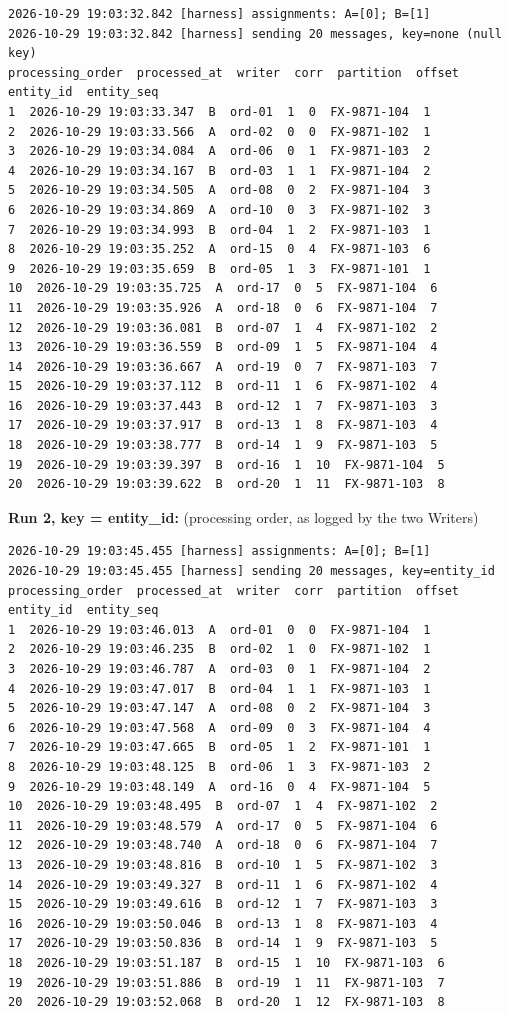 \documentclass[11pt]{article}
\begin{document}
\begingroup\lstset{basicstyle=\ttfamily\tiny}
\begin{lstlisting}
2026-10-29 19:03:32.842 [harness] assignments: A=[0]; B=[1]
2026-10-29 19:03:32.842 [harness] sending 20 messages, key=none (null key)
processing_order  processed_at  writer  corr  partition  offset  entity_id  entity_seq
1  2026-10-29 19:03:33.347  B  ord-01  1  0  FX-9871-104  1
2  2026-10-29 19:03:33.566  A  ord-02  0  0  FX-9871-102  1
3  2026-10-29 19:03:34.084  A  ord-06  0  1  FX-9871-103  2
4  2026-10-29 19:03:34.167  B  ord-03  1  1  FX-9871-104  2
5  2026-10-29 19:03:34.505  A  ord-08  0  2  FX-9871-104  3
6  2026-10-29 19:03:34.869  A  ord-10  0  3  FX-9871-102  3
7  2026-10-29 19:03:34.993  B  ord-04  1  2  FX-9871-103  1
8  2026-10-29 19:03:35.252  A  ord-15  0  4  FX-9871-103  6
9  2026-10-29 19:03:35.659  B  ord-05  1  3  FX-9871-101  1
10  2026-10-29 19:03:35.725  A  ord-17  0  5  FX-9871-104  6
11  2026-10-29 19:03:35.926  A  ord-18  0  6  FX-9871-104  7
12  2026-10-29 19:03:36.081  B  ord-07  1  4  FX-9871-102  2
13  2026-10-29 19:03:36.559  B  ord-09  1  5  FX-9871-104  4
14  2026-10-29 19:03:36.667  A  ord-19  0  7  FX-9871-103  7
15  2026-10-29 19:03:37.112  B  ord-11  1  6  FX-9871-102  4
16  2026-10-29 19:03:37.443  B  ord-12  1  7  FX-9871-103  3
17  2026-10-29 19:03:37.917  B  ord-13  1  8  FX-9871-103  4
18  2026-10-29 19:03:38.777  B  ord-14  1  9  FX-9871-103  5
19  2026-10-29 19:03:39.397  B  ord-16  1  10  FX-9871-104  5
20  2026-10-29 19:03:39.622  B  ord-20  1  11  FX-9871-103  8
\end{lstlisting}
\endgroup
\textbf{Run 2, key = entity\_id:} (processing order, as logged by the two Writers)

\begingroup\lstset{basicstyle=\ttfamily\tiny}
\begin{lstlisting}
2026-10-29 19:03:45.455 [harness] assignments: A=[0]; B=[1]
2026-10-29 19:03:45.455 [harness] sending 20 messages, key=entity_id
processing_order  processed_at  writer  corr  partition  offset  entity_id  entity_seq
1  2026-10-29 19:03:46.013  A  ord-01  0  0  FX-9871-104  1
2  2026-10-29 19:03:46.235  B  ord-02  1  0  FX-9871-102  1
3  2026-10-29 19:03:46.787  A  ord-03  0  1  FX-9871-104  2
4  2026-10-29 19:03:47.017  B  ord-04  1  1  FX-9871-103  1
5  2026-10-29 19:03:47.147  A  ord-08  0  2  FX-9871-104  3
6  2026-10-29 19:03:47.568  A  ord-09  0  3  FX-9871-104  4
7  2026-10-29 19:03:47.665  B  ord-05  1  2  FX-9871-101  1
8  2026-10-29 19:03:48.125  B  ord-06  1  3  FX-9871-103  2
9  2026-10-29 19:03:48.149  A  ord-16  0  4  FX-9871-104  5
10  2026-10-29 19:03:48.495  B  ord-07  1  4  FX-9871-102  2
11  2026-10-29 19:03:48.579  A  ord-17  0  5  FX-9871-104  6
12  2026-10-29 19:03:48.740  A  ord-18  0  6  FX-9871-104  7
13  2026-10-29 19:03:48.816  B  ord-10  1  5  FX-9871-102  3
14  2026-10-29 19:03:49.327  B  ord-11  1  6  FX-9871-102  4
15  2026-10-29 19:03:49.616  B  ord-12  1  7  FX-9871-103  3
16  2026-10-29 19:03:50.046  B  ord-13  1  8  FX-9871-103  4
17  2026-10-29 19:03:50.836  B  ord-14  1  9  FX-9871-103  5
18  2026-10-29 19:03:51.187  B  ord-15  1  10  FX-9871-103  6
19  2026-10-29 19:03:51.886  B  ord-19  1  11  FX-9871-103  7
20  2026-10-29 19:03:52.068  B  ord-20  1  12  FX-9871-103  8
\end{lstlisting}
\endgroup
\end{document}
